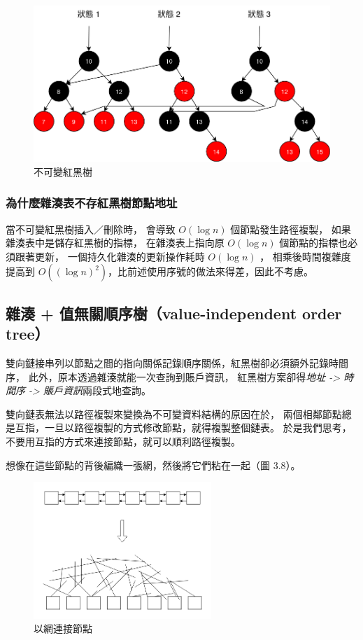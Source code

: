 \begin{figure}[h!]
\includegraphics[width=\textwidth]{不可變紅黑樹}
\caption{不可變紅黑樹}
\end{figure}

\subsubsection{為什麼雜湊表不存紅黑樹節點地址}
當不可變紅黑樹插入／刪除時，
會導致 $O(\log n)$ 個節點發生路徑複製，
如果雜湊表中是儲存紅黑樹的指標，
在雜湊表上指向原 $O(\log n)$ 個節點的指標也必須跟著更新，
一個持久化雜湊的更新操作耗時 $O(\log n)$ ，
相乘後時間複雜度提高到 $O((\log n)^2)$，比前述使用序號的做法來得差，因此不考慮。


\subsection{雜湊 + 值無關順序樹（value-independent order tree）}

雙向鏈接串列以節點之間的指向關係記錄順序關係，紅黑樹卻必須額外記錄時間序，
此外，原本透過雜湊就能一次查詢到賬戶資訊，
紅黑樹方案卻得\emph{地址 -> 時間序 -> 賬戶資訊}兩段式地查詢。

雙向鏈表無法以路徑複製來變換為不可變資料結構的原因在於，
兩個相鄰節點總是互指，一旦以路徑複製的方式修改節點，就得複製整個鏈表。
於是我們思考，不要用互指的方式來連接節點，就可以順利路徑複製。

想像在這些節點的背後編織一張網，然後將它們粘在一起（圖 3.8）。

\begin{figure}[ht]
\centerline{\includegraphics[width=0.6\textwidth]{節點網}}
\caption{以網連接節點}
\end{figure}

